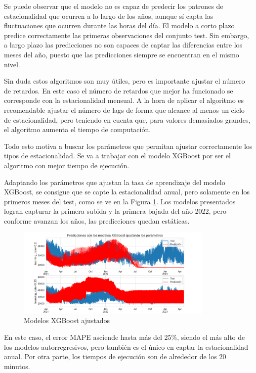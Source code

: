 \documentclass[12pt,twoside]{article}
\begin{document}
Se puede observar que el modelo no es capaz de predecir los patrones de estacionalidad que ocurren a lo largo de los años, aunque sí capta las fluctuaciones que ocurren durante las horas del día. El modelo a corto plazo predice correctamente las primeras observaciones del conjunto test. Sin embargo, a largo plazo las predicciones no son capaces de captar las diferencias entre los meses del año, puesto que las predicciones siempre se encuentran en el mismo nivel.

Sin duda estos algoritmos son muy útiles, pero es importante ajustar el número de retardos. En este caso el número de retardos que mejor ha funcionado se corresponde con la estacionalidad mensual. A la hora de aplicar el algoritmo es recomendable ajustar el número de lags de forma que alcance al menos un ciclo de estacionalidad, pero teniendo en cuenta que, para valores demasiados grandes, el algoritmo aumenta el tiempo de computación.




Todo esto motiva a buscar los parámetros que permitan ajustar correctamente los tipos de estacionalidad. Se va a trabajar con el modelo XGBoost por ser el algoritmo con mejor tiempo de ejecución. 

Adaptando los parámetros que ajustan la tasa de aprendizaje del modelo XGBoost, se consigue que se capte la estacionalidad anual, pero solamente en los primeros meses del test, como se ve en la Figura \ref{fig:XGBoost_adjust}. Los modelos presentados logran capturar la primera subida y la primera bajada del año 2022, pero conforme avanzan los años, las predicciones quedan estáticas.
\begin{figure}[h]
\centering
    \includegraphics[width = 0.85\textwidth]{imagenes/XGBoost_adjust.png}
    \caption{Modelos XGBoost ajustados}\label{fig:XGBoost_adjust}
\end{figure}

En este caso, el error MAPE asciende hasta más del $25\%$, siendo el más alto de los modelos autorregresivos, pero también es el único en captar la estacionalidad anual. Por otra parte, los tiempos de ejecución son de alrededor de los $20$ minutos. 
\end{document}

